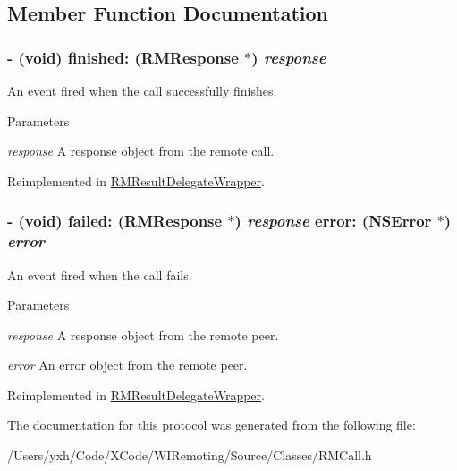 \subsection{Member Function Documentation}
\hypertarget{protocol_r_m_result_delegate-p_a965fe7cc4e150bb6ecf7cbb02b9c7248}{
\subsubsection[{finished:}]{\setlength{\rightskip}{0pt plus 5cm}-\/ (void) finished: ({\bf RMResponse} $\ast$) {\em response}}}
\label{protocol_r_m_result_delegate-p_a965fe7cc4e150bb6ecf7cbb02b9c7248}


An event fired when the call successfully finishes. 
\begin{DoxyParams}{Parameters}
\item[{\em response}]A response object from the remote call. \end{DoxyParams}


Reimplemented in \hyperlink{interface_r_m_result_delegate_wrapper_ac631e09ab641294f124b0e7d81b455c3}{RMResultDelegateWrapper}.\hypertarget{protocol_r_m_result_delegate-p_a3521cd9555449b32aabdb759d2dadce5}{
\subsubsection[{failed:error:}]{\setlength{\rightskip}{0pt plus 5cm}-\/ (void) failed: ({\bf RMResponse} $\ast$) {\em response}\/ error: (NSError $\ast$) {\em error}}}
\label{protocol_r_m_result_delegate-p_a3521cd9555449b32aabdb759d2dadce5}


An event fired when the call fails. 
\begin{DoxyParams}{Parameters}
\item[{\em response}]A response object from the remote peer. \item[{\em error}]An error object from the remote peer. \end{DoxyParams}


Reimplemented in \hyperlink{interface_r_m_result_delegate_wrapper_ad4fccdd6b67ba89b4abe76f64708b82c}{RMResultDelegateWrapper}.

The documentation for this protocol was generated from the following file:\begin{DoxyCompactItemize}
\item 
/Users/yxh/Code/XCode/WIRemoting/Source/Classes/RMCall.h\end{DoxyCompactItemize}

